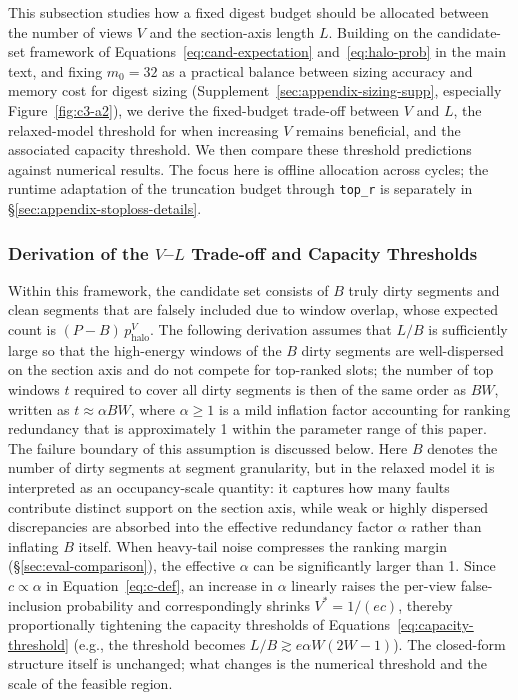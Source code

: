 \label{sec:appendix-budget-alloc}

This subsection studies how a fixed digest budget should be allocated between the number of views $V$ and the section-axis length $L$. Building on the candidate-set framework of Equations~\eqref{eq:cand-expectation} and~\eqref{eq:halo-prob} in the main text, and fixing $m_0{=}32$ as a practical balance between sizing accuracy and memory cost for digest sizing (Supplement~\ref{sec:appendix-sizing-supp}, especially Figure~\ref{fig:c3-a2}), we derive the fixed-budget trade-off between $V$ and $L$, the relaxed-model threshold for when increasing $V$ remains beneficial, and the associated capacity threshold. We then compare these threshold predictions against numerical results. The focus here is offline allocation across cycles; the runtime adaptation of the truncation budget through \texttt{top\_r} is  separately in \S\ref{sec:appendix-stoploss-details}.

\subsubsection{Derivation of the $V$--$L$ Trade-off and Capacity Thresholds}


Within this framework, the candidate set consists of $B$ truly dirty segments and clean segments that are falsely included due to window overlap, whose expected count is $(P{-}B)\,p_{\mathrm{halo}}^V$. The following derivation assumes that $L/B$ is sufficiently large so that the high-energy windows of the $B$ dirty segments are well-dispersed on the section axis and do not compete for top-ranked slots; the number of top windows $t$ required to cover all dirty segments is then of the same order as $BW$, written as $t \approx \alpha BW$, where $\alpha \ge 1$ is a mild inflation factor accounting for ranking redundancy that is approximately 1 within the parameter range of this paper. The failure boundary of this assumption is discussed below.
Here $B$ denotes the number of dirty segments at segment granularity, but in the relaxed model it is  interpreted as an occupancy-scale quantity: it captures how many faults contribute distinct support on the section axis, while weak or highly dispersed discrepancies are absorbed into the effective redundancy factor $\alpha$ rather than inflating $B$ itself.
When heavy-tail noise compresses the ranking margin (\S\ref{sec:eval-comparison}), the effective $\alpha$ can be significantly larger than 1. Since $c\propto \alpha$ in Equation~\eqref{eq:c-def}, an increase in $\alpha$ linearly raises the per-view false-inclusion probability and correspondingly shrinks $V^*=1/(ec)$, thereby proportionally tightening the capacity thresholds of Equations~\eqref{eq:capacity-threshold} (e.g., the threshold becomes $L/B\gtrsim e\alpha W(2W{-}1)$). The closed-form structure itself is unchanged; what changes is the numerical threshold and the scale of the feasible region.


